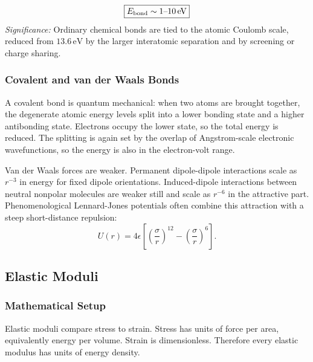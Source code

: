 \begin{equation}
    \boxed{
    E_{\rm bond}\sim 1\text{--}10\,\text{eV}
    }
    \label{eq:lec11:bond-scale}
\end{equation}
\textit{Significance:} Ordinary chemical bonds are tied to the atomic Coulomb
scale, reduced from $13.6\,\text{eV}$ by the larger interatomic separation and
by screening or charge sharing.

\subsubsection*{Covalent and van der Waals Bonds}
A covalent bond is quantum mechanical: when two atoms are brought together,
the degenerate atomic energy levels split into a lower bonding state and a
higher antibonding state. Electrons occupy the lower state, so the total energy
is reduced. The splitting is again set by the overlap of Angstrom-scale
electronic wavefunctions, so the energy is also in the electron-volt range.

Van der Waals forces are weaker. Permanent dipole-dipole interactions scale as
$r^{-3}$ in energy for fixed dipole orientations. Induced-dipole interactions
between neutral nonpolar molecules are weaker still and scale as $r^{-6}$ in
the attractive part. Phenomenological Lennard-Jones potentials often combine
this attraction with a steep short-distance repulsion:
\begin{equation}
    U(r)=4\epsilon\left[\left(\frac{\sigma}{r}\right)^{12}
    -\left(\frac{\sigma}{r}\right)^6\right].
    \label{eq:lec11:lennard-jones}
\end{equation}


\subsection{Elastic Moduli}
\label{sec:lec11:elastic-moduli}

\subsubsection*{Mathematical Setup}
Elastic moduli compare stress to strain. Stress has units of force per area,
equivalently energy per volume. Strain is dimensionless. Therefore every elastic
modulus has units of energy density.

